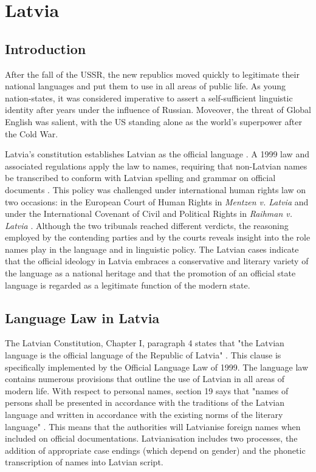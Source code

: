 \section{Latvia}

\subsection{Introduction}

After the fall of the USSR, the new republics moved quickly to legitimate their
national languages and put them to use in all areas of public life. As young
nation-states, it was considered imperative to assert a self-sufficient
linguistic identity after years under the influence of Russian. Moveover, the
threat of Global English was salient, with the US standing alone as the world's
superpower after the Cold War.

Latvia's constitution establishes Latvian as the official language
\parencite{lat-const}. A 1999 law and associated regulations apply the law to
names, requiring that non-Latvian names be transcribed to conform with Latvian
spelling and grammar on official documents \parencite{lat-lang}. This policy
was challenged under international human rights law on two occasions: in the
European Court of Human Rights in \textit{Mentzen v. Latvia}
\parencite{mentzen04} and under the International Covenant of Civil and
Political Rights in \textit{Raihman v.  Latvia} \parencite{raihman10}. Although
the two tribunals reached different verdicts, the reasoning employed by the
contending parties and by the courts reveals insight into the role names play
in the language and in linguistic policy. The Latvian cases indicate that the
official ideology in Latvia embraces a conservative and literary variety of the
language as a national heritage and that the promotion of an official state
language is regarded as a legitimate function of the modern state.

\subsection{Language Law in Latvia}

The Latvian Constitution, Chapter I, paragraph 4 states that "the Latvian
language is the official language of the Republic of Latvia"
\parencite{lat-const}. This clause is specifically implemented by the Official
Language Law of 1999. The language law contains numerous provisions that
outline the use of Latvian in all areas of modern life. With respect to
personal names, section 19 says that "names of persons shall be presented in
accordance with the traditions of the Latvian language and written in
accordance with the existing norms of the literary language"
\parencite{lat-lang}. This means that the authorities will Latvianise foreign
names when included on official documentations. Latvianisation includes two
processes, the addition of appropriate case endings (which depend on gender)
and the phonetic transcription of names into Latvian script.

